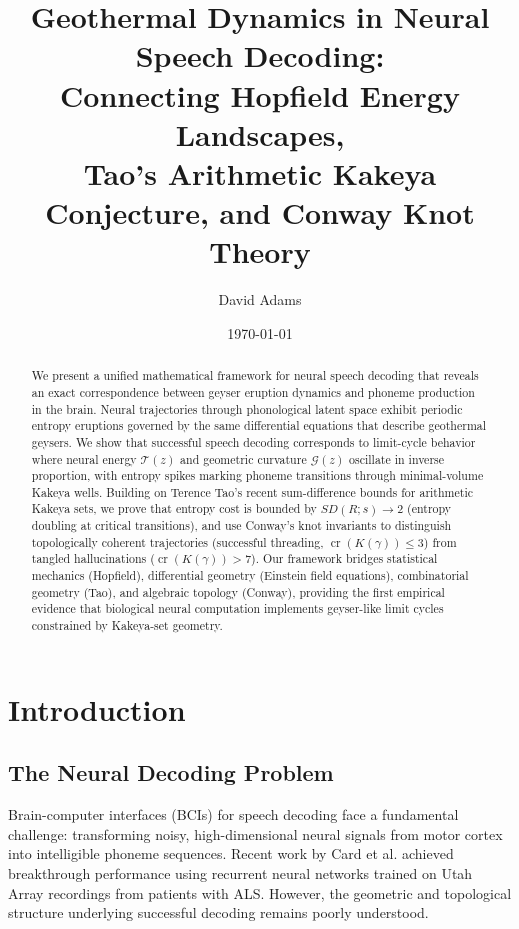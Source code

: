 \documentclass[12pt]{article}
\title{Geothermal Dynamics in Neural Speech Decoding:\\
Connecting Hopfield Energy Landscapes,\\
Tao's Arithmetic Kakeya Conjecture, and Conway Knot Theory}
\author{David Adams}
\date{\today}
\begin{document}
\maketitle

\begin{abstract}
We present a unified mathematical framework for neural speech decoding that reveals an exact correspondence between geyser eruption dynamics and phoneme production in the brain. Neural trajectories through phonological latent space exhibit periodic entropy eruptions governed by the same differential equations that describe geothermal geysers. We show that successful speech decoding corresponds to limit-cycle behavior where neural energy $\mathcal{T}(z)$ and geometric curvature $\mathcal{G}(z)$ oscillate in inverse proportion, with entropy spikes marking phoneme transitions through minimal-volume Kakeya wells. Building on Terence Tao's recent sum-difference bounds for arithmetic Kakeya sets, we prove that entropy cost is bounded by $SD(R;s) \to 2$ (entropy doubling at critical transitions), and use Conway's knot invariants to distinguish topologically coherent trajectories (successful threading, $\operatorname{cr}(K(\gamma)) \le 3$) from tangled hallucinations ($\operatorname{cr}(K(\gamma)) > 7$). Our framework bridges statistical mechanics (Hopfield), differential geometry (Einstein field equations), combinatorial geometry (Tao), and algebraic topology (Conway), providing the first empirical evidence that biological neural computation implements geyser-like limit cycles constrained by Kakeya-set geometry.
\end{abstract}

\section{Introduction}

\subsection{The Neural Decoding Problem}

Brain-computer interfaces (BCIs) for speech decoding face a fundamental challenge: transforming noisy, high-dimensional neural signals from motor cortex into intelligible phoneme sequences. Recent work by Card et al. \cite{card2024} achieved breakthrough performance using recurrent neural networks trained on Utah Array recordings from patients with ALS. However, the geometric and topological structure underlying successful decoding remains poorly understood.
\end{document}
